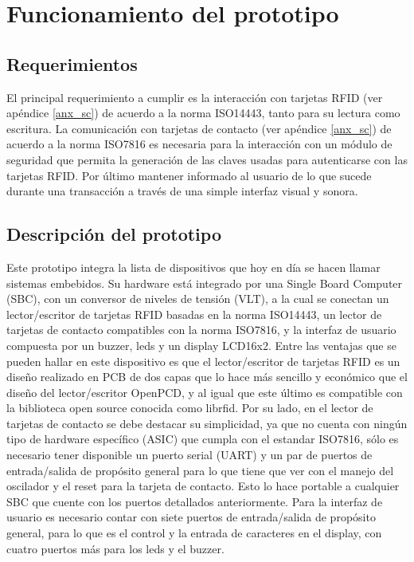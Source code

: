 \chapter{Funcionamiento del prototipo}

\section{Requerimientos}
El principal requerimiento a cumplir es la interacción con tarjetas RFID (ver apéndice \ref{anx_sc}) de acuerdo a la norma ISO14443, tanto para su lectura como escritura.
La comunicación con tarjetas de contacto (ver apéndice \ref{anx_sc}) de acuerdo a la norma ISO7816 es necesaria para la interacción con
un módulo de seguridad que permita la generación de las claves usadas para autenticarse
con las tarjetas RFID.
Por último mantener informado al usuario de lo que sucede durante una transacción
a través de una simple interfaz visual y sonora.


\section{Descripción del prototipo}
Este prototipo integra la lista de dispositivos que hoy en día se hacen llamar sistemas embebidos. Su hardware está integrado por una Single Board Computer (SBC), con un conversor de niveles de tensión (VLT), a la cual se conectan un lector/escritor de tarjetas RFID basadas en la norma ISO14443, un lector de tarjetas de contacto compatibles con la norma ISO7816, y la interfaz de usuario compuesta por un buzzer, leds y un display LCD16x2.
Entre las ventajas que se pueden hallar en este dispositivo es que el lector/escritor de tarjetas RFID es un diseño realizado en PCB de dos capas que lo hace más sencillo y económico que el diseño del lector/escritor OpenPCD, y al igual que este último es compatible con la biblioteca open source conocida como librfid.
Por su lado, en el lector de tarjetas de contacto se debe destacar su simplicidad, ya que no cuenta con ningún tipo de hardware específico (ASIC) que cumpla con el estandar ISO7816, sólo es necesario tener disponible un puerto serial (UART) y un par de puertos de entrada/salida de propósito general para lo que tiene que ver con el manejo del oscilador y el reset para la tarjeta de contacto. Esto lo hace portable a cualquier SBC que cuente con los puertos detallados anteriormente.
Para la interfaz de usuario es necesario contar con siete puertos de entrada/salida de propósito general, para lo que es el control y la entrada de caracteres en el display, con cuatro puertos más para los leds y el buzzer.


